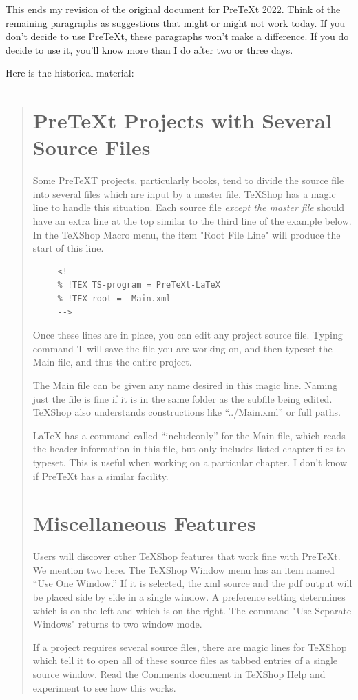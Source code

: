 \documentclass[11pt, oneside]{article}   	%
\begin{document}
This ends my revision of the original document for PreTeXt 2022. Think of the remaining paragraphs as suggestions that might or might not work today. If you don't decide to use PreTeXt, these paragraphs won't make a difference. If you do decide to use it, you'll know more than I do after two or three days. 

\newpage

Here is the historical material:
\begin{quotation}

\section{PreTeXt Projects with Several Source Files} 
Some PreTeXT projects, particularly books, tend to divide the source file into several files which are input by a master file. TeXShop has a magic line to handle this situation. Each source file {\em except the master file} should have an extra line at the top similar to the third line of the example below. In the TeXShop Macro menu, the item "Root File Line" will produce the start of this line.

\begin{verbatim}
     <!--
     % !TEX TS-program = PreTeXt-LaTeX
     % !TEX root =  Main.xml
     -->
\end{verbatim}

Once these lines are in place, you can edit any project source file. Typing command-T will save the file you are working on, and then typeset the Main file, and thus the entire project.

The Main file can be given any name desired in this magic line. Naming just the file is fine if it is in the same folder as the subfile being edited. TeXShop also understands constructions like ``../Main.xml'' or full paths. 

LaTeX has a command called ``includeonly'' for the Main file, which reads the header information in this file, but only includes listed chapter files to typeset. This is useful when working on a particular chapter. I don't know if PreTeXt has a similar facility.

\section{Miscellaneous Features}

Users will discover other TeXShop features that work fine with PreTeXt. We mention two here. The TeXShop Window menu has an item named ``Use One Window.'' If it is selected, the xml source and the pdf output will be placed side by side in a single window. A preference setting determines which is on the left and which is on the right. The command "Use Separate Windows" returns to two window mode.

If a project requires several source files, there are magic lines for TeXShop which tell it to open all of these source files as tabbed entries of a single source window. Read the Comments document in TeXShop Help and experiment to see how this works.

\end{quotation}
\end{document}

